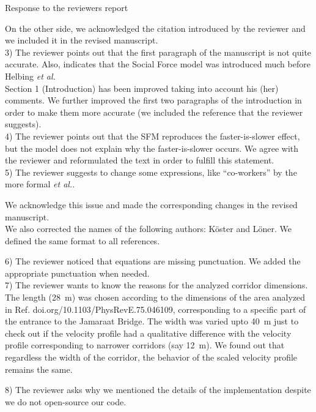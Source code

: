 \documentclass[a4paper,12pt]{letter}
\begin{document}
\begin{letter}{Response to the reviewers report}
{On the other side, we acknowledged the citation introduced by the reviewer and 
we included it in the revised manuscript. \\

3) The reviewer points out that the first paragraph of the manuscript is not 
quite accurate. Also, indicates that the Social Force model was introduced much 
before Helbing \textit{et al.} \\

Section 1 (Introduction) has been improved taking into account his (her) 
comments. We further improved the first two paragraphs of the introduction in order to 
make them more accurate (we included the reference that the reviewer suggests). \\ 

4) The reviewer points out that the SFM reproduces the faster-is-slower effect, but the model
does not explain why the faster-is-slower occurs. We agree with the reviewer and reformulated 
the text in order to fulfill this statement.\\

5) The reviewer suggests to change some expressions, like ``co-workers'' by 
the more formal \textit{et al.}. 

We acknowledge this issue and made the corresponding changes in the
revised manuscript. \\

We also corrected the names of the following authors: K\"oster and L\"oner. We defined the same format to all references.   

6) The reviewer noticed that equations are missing punctuation. We added the appropriate punctuation when needed. \\

7) The reviewer wants to know the reasons for the analyzed corridor dimensions. 
\\

The length (28~m) was chosen according to the dimensions of the area analyzed in Ref. doi.org/10.1103/PhysRevE.75.046109,  corresponding to a specific part of the entrance to the Jamaraat Bridge. 
The width was varied upto 40~m just to check out if the velocity profile had a qualitative difference with the velocity profile corresponding to narrower corridors (say 12~m). We found out that regardless the width of the corridor, the behavior of the scaled velocity profile remains the same. 

8) The reviewer asks why we mentioned the details of the implementation despite 
we do not open-source our code. \\

}
\end{letter}
\end{document}
